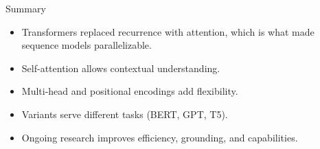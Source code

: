 \begin{frame}{Summary}
  \begin{itemize}
    \item[$\blacktriangleright$] Transformers replaced recurrence with attention, which is what made sequence models parallelizable.
    \item[$\blacktriangleright$] Self-attention allows contextual understanding.
    \item[$\blacktriangleright$] Multi-head and positional encodings add flexibility.
    \item[$\blacktriangleright$] Variants serve different tasks (BERT, GPT, T5).
    \item[$\blacktriangleright$] Ongoing research improves efficiency, grounding, and capabilities.
  \end{itemize}
\end{frame}

